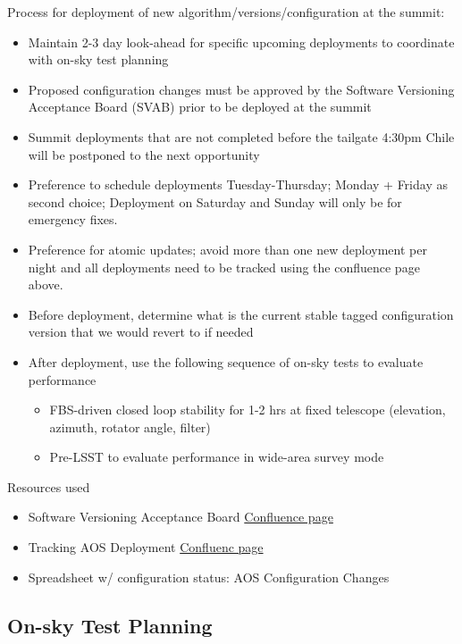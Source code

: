 \documentclass[SO,lsst,authoryear,toc]{lsstdoc}
\begin{document}
Process for deployment of new algorithm/versions/configuration at the summit:
\begin{itemize}
  \item Maintain 2-3 day look-ahead for specific upcoming deployments to coordinate with on-sky test planning
  \item Proposed configuration changes must be approved by the Software Versioning Acceptance Board (SVAB) prior to be deployed at the summit
  \item Summit deployments that are not completed before the tailgate 4:30pm Chile will be postponed to the next opportunity
  \item Preference to schedule deployments Tuesday-Thursday; Monday + Friday as second choice; Deployment on Saturday and Sunday will only be for emergency fixes.
  \item Preference for atomic updates; avoid more than one new deployment per night and all deployments need to be tracked using the confluence page above.
  \item Before deployment, determine what is the current stable tagged configuration version that we would revert to if needed
  \item After deployment, use the following sequence of on-sky tests to evaluate performance
  \begin{itemize}
    \item FBS-driven closed loop stability for 1-2 hrs at fixed telescope (elevation, azimuth, rotator angle, filter)
    \item Pre-LSST to evaluate performance in wide-area survey mode
  \end{itemize}
\end{itemize}

Resources used
\begin{itemize}
  \item Software Versioning Acceptance Board \href{https://rubinobs.atlassian.net/wiki/spaces/LSSTOps/pages/1248460829/Software+Versioning+Acceptance+Board}{Confluence page}
  \item Tracking AOS Deployment \href{https://rubinobs.atlassian.net/wiki/spaces/LTS/pages/1681391688/AOS+Deployment+Status}{Confluenc page}
  \item Spreadsheet w/ configuration status: AOS Configuration Changes
\end{itemize}

\subsection{On-sky Test Planning}
\end{document}
